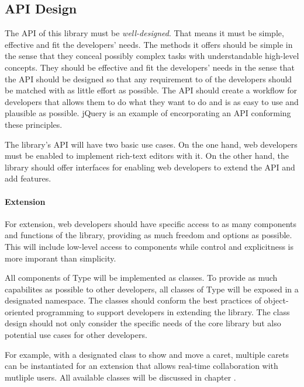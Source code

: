 \subsection{API Design}


The API of this library must be \textit{well-designed}. That means it must be simple, effective and fit the developers' needs. The methods it offers should be simple in the sense that they conceal possibly complex tasks with understandable high-level concepts. They should be effective and fit the developers' needs in the sense that the API should be designed so that any requirement to of the developers should be matched with as little effort as possible. The API should create a workflow for developers that allows them to do what they want to do and is as easy to use and plausible as possible. jQuery is an example of encorporating an API conforming these principles.

The library's API will have two basic use cases. On the one hand, web developers must be enabled to implement rich-text editors with it. On the other hand, the library should offer interfaces for enabling web developers to extend the API and add features.

\paragraph{Extension}

For extension, web developers should have specific access to as many components and functions of the library, providing as much freedom and options as possible. This will include low-level access to components while control and explicitness is more imporant than simplicity. 

All components of Type will be implemented as classes. To provide as much capabilites as possible to other developers, all classes of Type will be exposed in a designated namespace. The classes should conform the best practices of object-oriented programming to support developers in extending the library. The class design should not only consider the specific needs of the core library but also potential use cases for other developers.

For example, with a designated class to show and move a caret, multiple carets can be instantiated for an extension that allows real-time collaboration with mutliple users. All available classes will be discussed in chapter .

